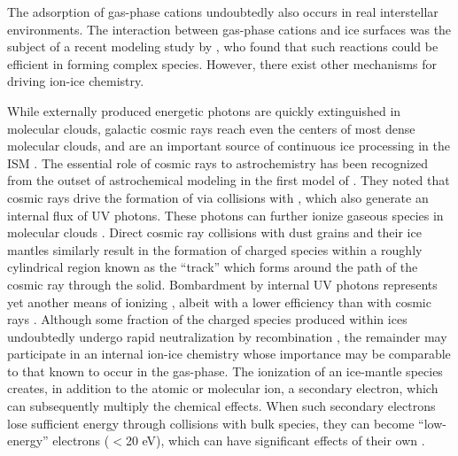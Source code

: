 \documentclass[journal=aesccq,manuscript=article,layout=twocolumn]{achemso}
\begin{document}
The adsorption of gas-phase cations undoubtedly also occurs in real interstellar environments. The interaction between gas-phase cations and ice surfaces was the subject of a recent modeling study by \citet{cui_exploring_2024}, who found that such reactions could be efficient in forming complex species. However, there exist other mechanisms for driving ion-ice chemistry. 

While externally produced energetic photons are quickly extinguished in molecular clouds, galactic cosmic rays reach even the centers of most dense molecular clouds\citep{ivlev_penetration_2018}, and are an important source of continuous ice processing in the ISM \citep{strazzulla_ion_2009,dartois_cosmic_2018}.  The essential role of cosmic rays to astrochemistry has been recognized from the outset of astrochemical modeling in the first model of \citet{herbst_formation_1973}. They noted that cosmic rays drive the formation of  via collisions with , which also generate an internal flux of UV photons. These photons can further ionize gaseous species in molecular clouds \citep{prasad_uv_1983}.  Direct cosmic ray collisions with dust grains and their ice mantles similarly result in the formation of charged species within a roughly cylindrical region known as the ``track'' \citep{shingledecker_cosmic-ray_2020} which forms around the path of the cosmic ray through the solid.  Bombardment by internal UV photons represents yet another means of ionizing \citep{mullikin_new_2021}, albeit with a lower efficiency than with cosmic rays \citep{wu_role_2024}.  Although some fraction of the charged species produced within ices undoubtedly undergo rapid neutralization by recombination \citep{shingledecker_general_2018,woon_formation_2024}, the remainder may participate in an internal ion-ice chemistry whose importance may be comparable to that known to occur in the gas-phase. The ionization of an ice-mantle species creates, in addition to the atomic or molecular ion, a secondary electron, which can subsequently multiply the chemical effects. When such secondary electrons lose sufficient energy through collisions with bulk species, they can become ``low-energy'' electrons ($<$20 eV), which can have significant effects of their own \citep{arumainayagam_low-energy_2010,boamah_low-energy_2014,boyer_role_2016,wu_role_2024}.
\end{document}

